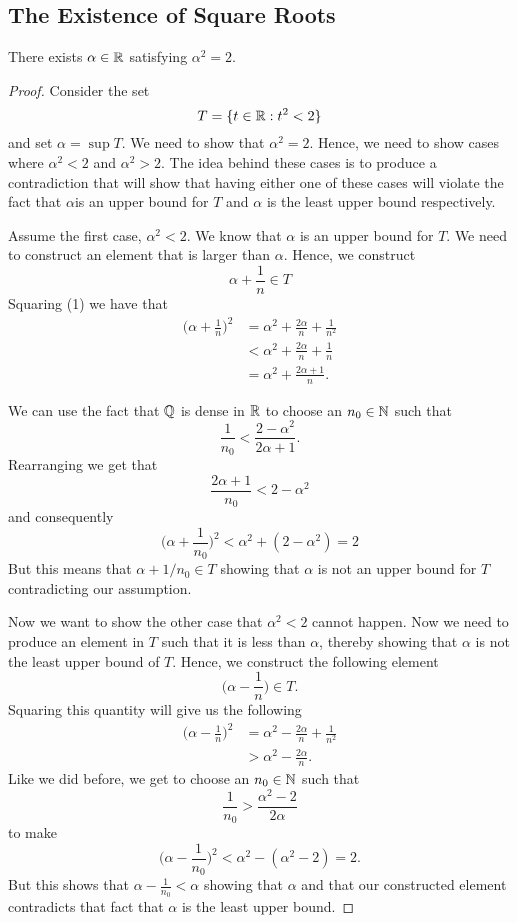 \subsection{The Existence of Square Roots}
\begin{theorem}
    There exists \( \alpha \in \mathbb{R}  \) satisfying \( \alpha^2 = 2 \).
\end{theorem}
\begin{proof}
    Consider the set 
    \[ T = \{ t \in \mathbb{R} : t^2 < 2 \} \]
    and set \( \alpha = \sup T \). We need to show that \( \alpha^2 = 2\). Hence, we need to show cases where \(  \alpha^2 < 2 \) and \( \alpha^2 > 2 \). The idea behind these cases is to produce a contradiction that will show that having either one of these cases will violate the fact that \( \alpha \)is an upper bound for \( T \) and \( \alpha\) is the least upper bound respectively. 

    Assume the first case, \( \alpha^2 < 2 \). We know that \( \alpha\) is an upper bound for \( T \). We need to construct an element that is larger than \( \alpha \). Hence, we construct 
    \[ \alpha + \frac{1}{n} \in T \tag{1}\]
    Squaring (1) we have that 
    \begin{align*}
        \bigg(\alpha + \frac{1}{n}\bigg)^2 &= \alpha^2 + \frac{2\alpha}{n} + \frac{1}{n^2} \\ 
                &< \alpha^2 + \frac{2\alpha}{n} + \frac{1}{n} \\
                &= \alpha^2 + \frac{2\alpha + 1}{n}.
    \end{align*}

    We can use the fact that \( \mathbb{Q} \) is dense in \( \mathbb{R} \) to choose an \( n_0 \in \mathbb{N} \) such that 
    \[ \frac{1}{n_0} < \frac{ 2 - \alpha^2}{2 \alpha + 1 }.\]
    Rearranging we get that 
    \[ \frac{2 \alpha + 1}{n_0} <  2 - \alpha^2 \] 
    and consequently 
    \[\bigg(\alpha + \frac{1}{n_0}\bigg)^2 < \alpha^2 + (2 - \alpha^2) = 2 \]
    But this means that \( \alpha + 1/n_0 \in T \) showing that \( \alpha \) is not an upper bound for \( T \) contradicting our assumption. 

    Now we want to show the other case that \( \alpha^2 < 2 \) cannot happen. Now we need to produce an element in \( T \) such that it is less than \( \alpha \), thereby showing that \( \alpha \) is not the least upper bound of \( T \). Hence, we construct the following element 
    \[ \bigg(\alpha - \frac{1}{n}\bigg)\in T. \]
    Squaring this quantity will give us the following
    \begin{align*}
        \bigg(\alpha - \frac{1}{n}\bigg)^2 &= \alpha^2 -\frac{2\alpha}{n} + \frac{1}{n^2} \\
        &> \alpha^2 - \frac{2 \alpha}{n}.
    \end{align*}
    Like we did before, we get to choose an \( n_0 \in \mathbb{N} \) such that 
    \[ \frac{1}{n_0} > \frac{\alpha^2 - 2}{2 \alpha} \]
    to make 
    \[\bigg(\alpha - \frac{1}{n_0}\bigg)^2 < \alpha^2 - (\alpha^2 - 2) = 2.\]
    But this shows that \( \alpha - \frac{1}{n_0} < \alpha \) showing that \( \alpha \) and that our constructed element contradicts that fact that \( \alpha\) is the least upper bound. 

\end{proof}



